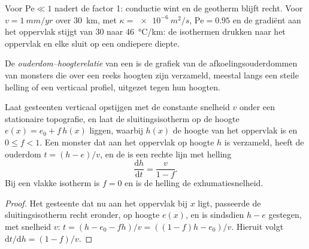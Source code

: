 Voor $\mathrm{Pe} \ll 1$ nadert de factor 1: conductie wint en de
geotherm blijft recht. Voor $v = \qty{1}{mm/yr}$ over \qty{30}{km}, met
$\kappa = \qty{e-6}{m^2/s}$, $\mathrm{Pe} = 0.95$ en de gradiënt aan het oppervlak
stijgt van 30 naar \qty{46}{\celsius/km}: de isothermen drukken naar het
oppervlak en elke  sluit op een ondiepere diepte.

\begin{definition}\label{def:b3:orogenic-wedges:age-elevation}
De \emph{ouderdom--hoogterelatie} van een
 is de grafiek van de afkoelingsouderdommen van monsters die over een
reeks hoogten zijn verzameld, meestal langs een steile helling of een verticaal profiel,
uitgezet tegen hun hoogten.
\end{definition}

\begin{proposition}\label{prop:b3:orogenic-wedges:age-elevation}
Laat gesteenten verticaal opstijgen met de constante snelheid $v$ onder een stationaire
topografie, en laat de sluitingsisotherm op de hoogte $e(x) = e_0 +
f\,h(x)$ liggen, waarbij $h(x)$ de hoogte van het oppervlak is en $0 \le f < 1$. Een monster
dat aan het oppervlak op hoogte $h$ is verzameld, heeft de ouderdom $t = (h - e)/v$,
en de  is een rechte lijn met helling
\[
  \frac{\mathrm dh}{\mathrm dt} = \frac{v}{1 - f}.
\]
Bij een vlakke isotherm is $f = 0$ en is de helling de exhumatiesnelheid.
\end{proposition}

\begin{proof}
Het gesteente dat nu aan het oppervlak bij $x$ ligt, passeerde de sluitingsisotherm recht
eronder, op hoogte $e(x)$, en is sindsdien $h - e$ gestegen, met snelheid $v$:
$t = (h - e_0 - fh)/v = ((1 - f)h - e_0)/v$. Hieruit volgt $\mathrm dt/\mathrm dh =
(1 - f)/v$.
\end{proof}

